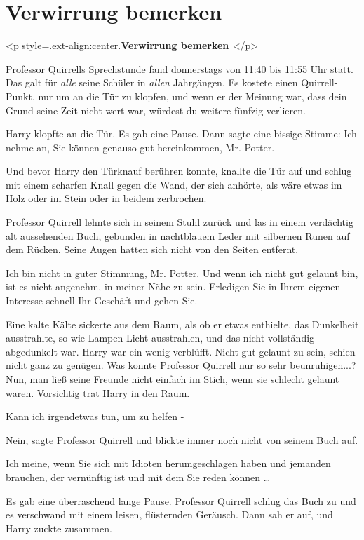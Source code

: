 
\chapter{Verwirrung bemerken}


		<p style=\grqq{}.ext-align:center\grqq{}.\textbf{\underline{Verwirrung
		bemerken }}</p>

Professor Quirrells Sprechstunde fand donnerstags von 11:40 bis 11:55 Uhr statt.
Das galt für \emph{alle} seine Schüler in \emph{allen} Jahrgängen. Es kostete
einen Quirrell-Punkt, nur um an die Tür zu klopfen, und wenn er der Meinung war,
dass dein Grund seine Zeit nicht wert war, würdest du weitere fünfzig verlieren.

Harry klopfte an die Tür. Es gab eine Pause. Dann sagte eine bissige Stimme:
\glqq Ich nehme an, Sie können genauso gut hereinkommen, Mr. Potter.\grqq{}

Und bevor Harry den Türknauf berühren konnte, knallte die Tür auf und schlug mit
einem scharfen Knall gegen die Wand, der sich anhörte, als wäre etwas im Holz
oder im Stein oder in beidem zerbrochen.

Professor Quirrell lehnte sich in seinem Stuhl zurück und las in einem
verdächtig alt aussehenden Buch, gebunden in nachtblauem Leder mit silbernen
Runen auf dem Rücken. Seine Augen hatten sich nicht von den Seiten entfernt.

\glqq Ich bin nicht in guter Stimmung, Mr. Potter. Und wenn ich nicht gut
gelaunt bin, ist es nicht angenehm, in meiner Nähe zu sein. Erledigen Sie in
Ihrem eigenen Interesse schnell Ihr Geschäft und gehen Sie.\grqq{}

Eine kalte Kälte sickerte aus dem Raum, als ob er etwas enthielte, das
Dunkelheit ausstrahlte, so wie Lampen Licht ausstrahlen, und das nicht
vollständig abgedunkelt war. Harry war ein wenig verblüfft. Nicht gut gelaunt zu
sein, schien nicht ganz zu genügen. Was konnte Professor Quirrell nur so sehr
beunruhigen...? Nun, man ließ seine Freunde nicht einfach im Stich, wenn sie
schlecht gelaunt waren. Vorsichtig trat Harry in den Raum.

\glqq Kann ich irgendetwas tun, um zu helfen -\grqq{}

\glqq Nein\grqq{}, sagte Professor Quirrell und blickte immer noch nicht von
seinem Buch auf.

\glqq Ich meine, wenn Sie sich mit Idioten herumgeschlagen haben und jemanden
brauchen, der vernünftig ist und mit dem Sie reden können …\grqq{}

Es gab eine überraschend lange Pause. Professor Quirrell schlug das Buch zu und
es verschwand mit einem leisen, flüsternden Geräusch. Dann sah er auf, und Harry
zuckte zusammen.

